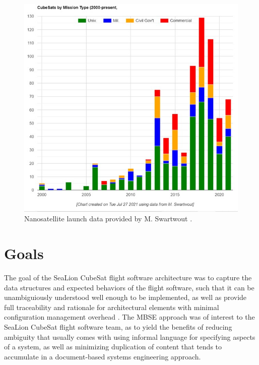 \documentclass[conf]{new-aiaa}
\begin{document}
\begin{figure}[hbt!]
    \centering
    \includegraphics[width=.8\textwidth]{swartwout_data_graph}
    \caption{Nanosatellite launch data provided by M. Swartwout \cite{swartwout_data}.}
    \label{swartwout_data_graph}
\end{figure}


\section{Goals}

The goal of the SeaLion CubeSat flight software architecture was to capture the data structures and expected behaviors of the flight software, such that it can be unambiguiously understood well enough to be implemented, as well as provide full traceability and rationale for architectural elements with minimal configuration management overhead \cite{sealion_mission_architecture}. The MBSE approach was of interest to the SeaLion CubeSat flight software team, as to yield the benefits of reducing ambiguity that usually comes with using informal language for specifying aspects of a system, as well as minimizing duplication of content that tends to accumulate in a document-based systems engineering approach.
\end{document}
